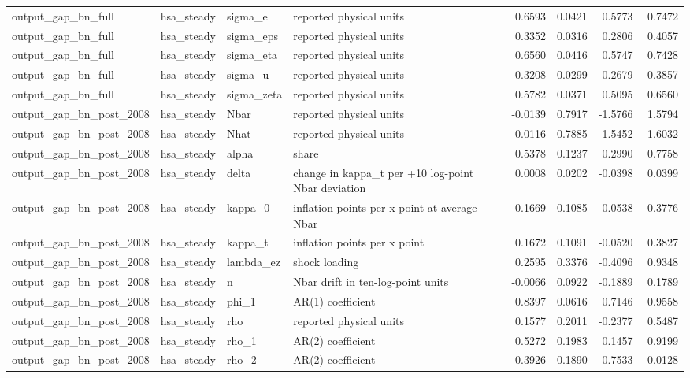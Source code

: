 \begin{tabular}{llllrrrr}
output\_gap\_bn\_full & hsa\_steady & sigma\_e & reported physical units & 0.6593 & 0.0421 & 0.5773 & 0.7472 \\
output\_gap\_bn\_full & hsa\_steady & sigma\_eps & reported physical units & 0.3352 & 0.0316 & 0.2806 & 0.4057 \\
output\_gap\_bn\_full & hsa\_steady & sigma\_eta & reported physical units & 0.6560 & 0.0416 & 0.5747 & 0.7428 \\
output\_gap\_bn\_full & hsa\_steady & sigma\_u & reported physical units & 0.3208 & 0.0299 & 0.2679 & 0.3857 \\
output\_gap\_bn\_full & hsa\_steady & sigma\_zeta & reported physical units & 0.5782 & 0.0371 & 0.5095 & 0.6560 \\
output\_gap\_bn\_post\_2008 & hsa\_steady & Nbar & reported physical units & -0.0139 & 0.7917 & -1.5766 & 1.5794 \\
output\_gap\_bn\_post\_2008 & hsa\_steady & Nhat & reported physical units & 0.0116 & 0.7885 & -1.5452 & 1.6032 \\
output\_gap\_bn\_post\_2008 & hsa\_steady & alpha & share & 0.5378 & 0.1237 & 0.2990 & 0.7758 \\
output\_gap\_bn\_post\_2008 & hsa\_steady & delta & change in kappa\_t per +10 log-point Nbar deviation & 0.0008 & 0.0202 & -0.0398 & 0.0399 \\
output\_gap\_bn\_post\_2008 & hsa\_steady & kappa\_0 & inflation points per x point at average Nbar & 0.1669 & 0.1085 & -0.0538 & 0.3776 \\
output\_gap\_bn\_post\_2008 & hsa\_steady & kappa\_t & inflation points per x point & 0.1672 & 0.1091 & -0.0520 & 0.3827 \\
output\_gap\_bn\_post\_2008 & hsa\_steady & lambda\_ez & shock loading & 0.2595 & 0.3376 & -0.4096 & 0.9348 \\
output\_gap\_bn\_post\_2008 & hsa\_steady & n & Nbar drift in ten-log-point units & -0.0066 & 0.0922 & -0.1889 & 0.1789 \\
output\_gap\_bn\_post\_2008 & hsa\_steady & phi\_1 & AR(1) coefficient & 0.8397 & 0.0616 & 0.7146 & 0.9558 \\
output\_gap\_bn\_post\_2008 & hsa\_steady & rho & reported physical units & 0.1577 & 0.2011 & -0.2377 & 0.5487 \\
output\_gap\_bn\_post\_2008 & hsa\_steady & rho\_1 & AR(2) coefficient & 0.5272 & 0.1983 & 0.1457 & 0.9199 \\
output\_gap\_bn\_post\_2008 & hsa\_steady & rho\_2 & AR(2) coefficient & -0.3926 & 0.1890 & -0.7533 & -0.0128 \\

\end{tabular}
